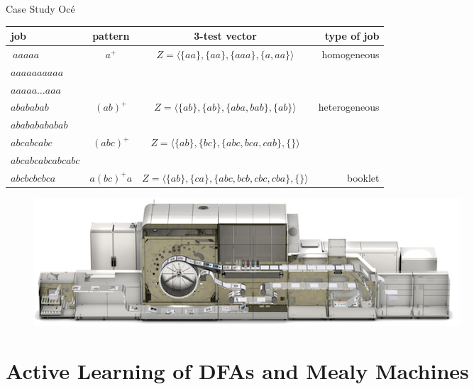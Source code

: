 \documentclass[pdf]{beamer}
\begin{document}
\begin{frame}{Case Study Oc\'e}
\begin{center}
\tiny
\begin{tabular}{lccr}
\toprule
job & pattern   & 3-test vector & type of job \\ 
\midrule
$\ aaaaa$ 						& \multirow{3}{*}{$a^+$}  	& \multirow{3}{*}{$Z=\langle \{aa\},\{aa\},\{aaa\},\{a,aa\} \rangle$}	& \multirow{3}{*}{homogeneous} \\
\cline{1-1}
\rule{0pt}{2.5ex} $aaaaaaaaaa$ & 						 	&					&				\\
\cline{1-1}
\rule{0pt}{2.5ex} $aaaaa\ldots aaa$ &					&						&			\\
\cline{1-4}
\rule{0pt}{2.5ex} $abababab$	& \multirow{2}{*}{$(ab)^+$} & \multirow{2}{*}{$Z=\langle \{ab\},\{ab\},\{aba,bab\},\{ab\} \rangle$}	& \multirow{4}{*}{heterogeneous} 			\\
\cline{1-1}
\rule{0pt}{2.5ex} $abababababab$	&					& 			&						\\
\cline{1-3}
\rule{0pt}{2.5ex} $abcabcabc$	& \multirow{2}{*}{$(abc)^+$}& 		\multirow{2}{*}{$Z=\langle \{ab\},\{bc\},\{abc,bca,cab\},\{\} \rangle$}						&	\\
\cline{1-1}
\rule{0pt}{2.5ex} $abcabcabcabcabc$ & 					&			&						\\
\cline{1-4}
\rule{0pt}{2.5ex} $abcbcbcbca$ & $a(bc)^+a$ 				& $Z=\langle \{ab\},\{ca\},\{abc,bcb,cbc,cba\},\{\} \rangle$  & booklet \\
\bottomrule
\end{tabular}

\begin{figure}
\vspace{0.3cm}
\includegraphics[width=0.7\linewidth]{2015-03-01-varioprint-i300-2.jpg}
\end{figure}

\end{center}

\end{frame}



\section{Active Learning of DFAs and Mealy Machines}
\end{document}
